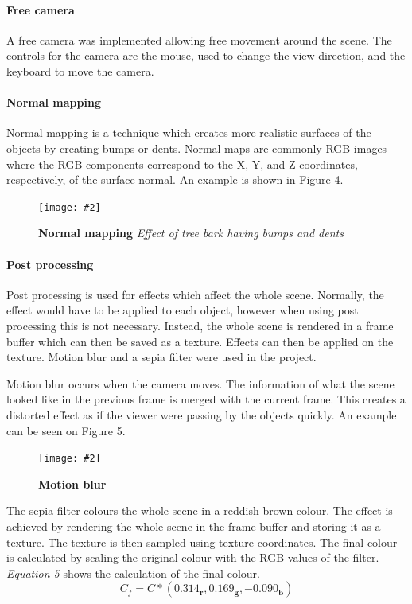 \documentclass[10pt, a4paper]{article}
\newcommand{\figuremacro}[5]{
    \begin{figure}[#1]
        \centering
        \texttt{[image: \#2]}
        \caption[#3]{\textbf{#3}#4}
        \label{fig:#2}
    \end{figure}
}
\begin{document}
    \paragraph{Free camera} A free camera was implemented allowing free movement around the scene. The controls for the camera are the mouse, used to change the view direction, and the keyboard to move the camera.

    \paragraph{Normal mapping} Normal mapping is a technique which creates more realistic surfaces of the objects by creating bumps or dents. Normal maps are commonly RGB images where the RGB components correspond to the X, Y, and Z coordinates, respectively, of the surface normal. An example is shown in Figure 4.

    \figuremacro{h}{nm.png}{Normal mapping}{ \textit{Effect of tree bark having bumps and dents} }{1.0}

    \paragraph{Post processing} Post processing is used for effects which affect the whole scene. Normally, the effect would have to be applied to each object, however when using post processing this is not necessary. Instead, the whole scene is rendered in a frame buffer which can then be saved as a texture. Effects can then be applied on the texture.
    Motion blur and a sepia filter were used in the project.

    Motion blur occurs when the camera moves. The information of what the scene looked like in the previous frame is merged with the current frame. This creates a distorted effect as if the viewer were passing by the objects quickly. An example can be seen on Figure 5.

    \figuremacro{h}{blur.png}{Motion blur}{}{1.0}

    The sepia filter colours the whole scene in a reddish-brown colour. The effect is achieved by rendering the whole scene in the frame buffer and storing it as a texture. The texture is then sampled using texture coordinates. The final colour is calculated by scaling the original colour with the RGB values of the filter. \textit{Equation 5} shows the calculation of the final colour.
      \begin{equation}
      C_f = C * \mathbf{(0.314_r, 0.169_g, -0.090_b)}
      \end{equation}
\end{document}
